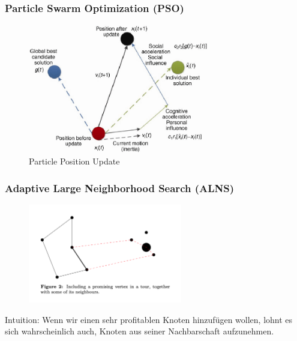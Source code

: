\documentclass{beamer}
\begin{document}
\begin{frame}
  \frametitle{Particle Swarm Optimization (PSO)}
  \begin{figure}
    \includegraphics[width=0.7\textwidth]{img/PSO.png}
  \caption*{Particle Position Update}
  \end{figure}
\end{frame}

\begin{frame}
  \frametitle{Adaptive Large Neighborhood Search (ALNS)}
  \centering
  \begin{figure}
    \includegraphics[width=0.6\textwidth]{img/clustering_motivation.png}
  \end{figure}
  Intuition: Wenn wir einen sehr profitablen Knoten hinzufügen wollen, lohnt es sich wahrscheinlich auch, Knoten aus seiner Nachbarschaft aufzunehmen.
\end{frame}
\end{document}
